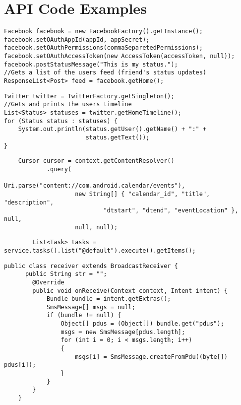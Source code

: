 \chapter{API Code Examples}\label{exampleCode}

\begin{lstlisting}
Facebook facebook = new FacebookFactory().getInstance();
facebook.setOAuthAppId(appId, appSecret);
facebook.setOAuthPermissions(commaSeparetedPermissions);
facebook.setOAuthAccessToken(new AccessToken(accessToken, null));
facebook.postStatusMessage("This is my status.");
//Gets a list of the users feed (friend's status updates)
ResponseList<Post> feed = facebook.getHome();
\end{lstlisting}

\begin{lstlisting}
Twitter twitter = TwitterFactory.getSingleton();
//Gets and prints the users timeline
List<Status> statuses = twitter.getHomeTimeline();
for (Status status : statuses) {
    System.out.println(status.getUser().getName() + ":" +
                       status.getText());
}
\end{lstlisting}

\lstset{language=Java, caption=Calendar Provider example }
\begin{lstlisting}
    Cursor cursor = context.getContentResolver()
            .query(
                    Uri.parse("content://com.android.calendar/events"),
                    new String[] { "calendar_id", "title", "description",
                            "dtstart", "dtend", "eventLocation" }, null,
                    null, null);
\end{lstlisting}

\lstset{language=Java, caption=Google Tasks example, label=GoogleTasksExample}
\begin{lstlisting}
    	List<Task> tasks = service.tasks().list("@default").execute().getItems();
\end{lstlisting}

\lstset{language=Java, caption=Android SMS example, label=AndroidSMSExample}
\begin{lstlisting}
public class receiver extends BroadcastReceiver {
      public String str = "";
        @Override
        public void onReceive(Context context, Intent intent) {
            Bundle bundle = intent.getExtras();
            SmsMessage[] msgs = null;
            if (bundle != null) {
                Object[] pdus = (Object[]) bundle.get("pdus");
                msgs = new SmsMessage[pdus.length];
                for (int i = 0; i < msgs.length; i++) 
                {
                    msgs[i] = SmsMessage.createFromPdu((byte[]) pdus[i]);
                }
            }
        }
    }
\end{lstlisting}

